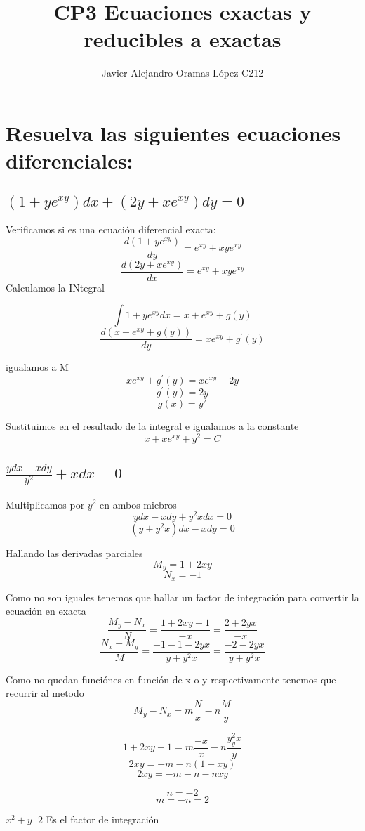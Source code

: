 \documentclass{article}
\title{CP3 Ecuaciones exactas y reducibles a exactas}
\author{Javier Alejandro Oramas López C212}
\begin{document}
    
    \section{Resuelva las siguientes ecuaciones diferenciales:}
        \subsection{$(1 + ye^{xy})dx + (2y + xe^{xy})dy = 0$}
            Verificamos si es una ecuación diferencial exacta:
            \[ \frac{d(1+ye^{xy})}{dy} = e^{xy} + xye^{xy}\]
            \[ \frac{d(2y+xe^{xy})}{dx} = e^{xy} + xye^{xy}\]
            Calculamos la INtegral

            \[\int 1+ye^{xy} dx = x+e^{xy} + g(y) \]
            \[\frac{d(x+e^{xy}+g(y))}{dy} = xe^{xy}+g^{'}(y)\]

            igualamos a M
            \[xe^{xy}+g^{'}(y) = xe^{xy} +2y\]
            \[g^{'}(y) = 2y\]
            \[g(x) = y^2\]

            Sustituimos en el resultado de la integral e igualamos a la constante
            \[x+xe^{xy}+y^2 = C\]
        \subsection{$\frac{ydx-xdy}{y^2}+xdx = 0$}
            Multiplicamos por $y^2$ en ambos miebros
            \[ydx-xdy+y^2xdx = 0\]
            \[(y+y^2x)dx -xdy = 0\]

            Hallando las derivadas parciales
            \[M_y = 1+2xy\]
            \[N_x = -1\]

            Como no son iguales tenemos que hallar un factor de integración para convertir la ecuación en exacta
            \[\frac{M_y-N_x}{N} = \frac{1+2xy+1}{-x} = \frac{2+2yx}{-x}\]
            \[\frac{N_x-M_y}{M} = \frac{-1-1-2yx}{y+y^2x} = \frac{-2-2yx}{y+y^2x}\]

            Como no quedan funciónes en función de x o y respectivamente tenemos que recurrir al metodo
            \[M_y-N_x= m \frac{N}{x} - n \frac{M}{y}\]

            \[1+2xy-1 = m \frac{-x}{x} - n \frac{y_y^2x}{y}\]
            \[2xy = -m -n (1+xy)\]
            \[2xy = -m-n-nxy\]


            \[n = -2\]
            \[m = -n = 2\]

            $x^2+y^-2$ Es el factor de integración 
\end{document}
